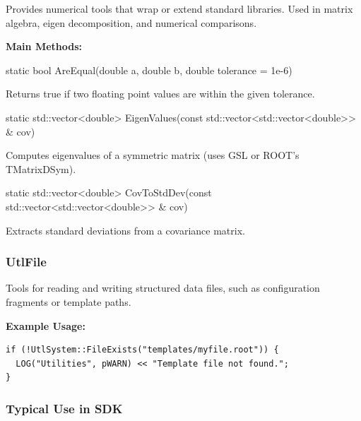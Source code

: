 Provides numerical tools that wrap or extend standard libraries.  
Used in matrix algebra, eigen decomposition, and numerical comparisons.

\vspace{0.5em}
\noindent\textbf{Main Methods:}

\begin{description}[align=left]

  \item[] {\color{cadmiumred} static bool AreEqual(double a, double b, double tolerance = 1e-6)}

  Returns {\color{amber}true} if two floating point values are within the given tolerance.

  \item[] {\color{cadmiumred} static std::vector<double> EigenValues(const std::vector<std::vector<double>> \& cov)}

  Computes eigenvalues of a symmetric matrix (uses GSL or ROOT’s {\color{cadmiumgreen} TMatrixDSym}).

  \item[] {\color{cadmiumred} static std::vector<double> CovToStdDev(const std::vector<std::vector<double>> \& cov)}

  Extracts standard deviations from a covariance matrix.

\end{description}

\vspace{1em}
\subsubsection*{\color{cadmiumgreen}\bf UtlFile}

Tools for reading and writing structured data files, such as configuration fragments or template paths.

\vspace{0.5em}
\noindent\textbf{Example Usage:}

\begin{lstlisting}
if (!UtlSystem::FileExists("templates/myfile.root")) {
  LOG("Utilities", pWARN) << "Template file not found.";
}
\end{lstlisting}

\vspace{1em}
\subsubsection*{Typical Use in SDK}

